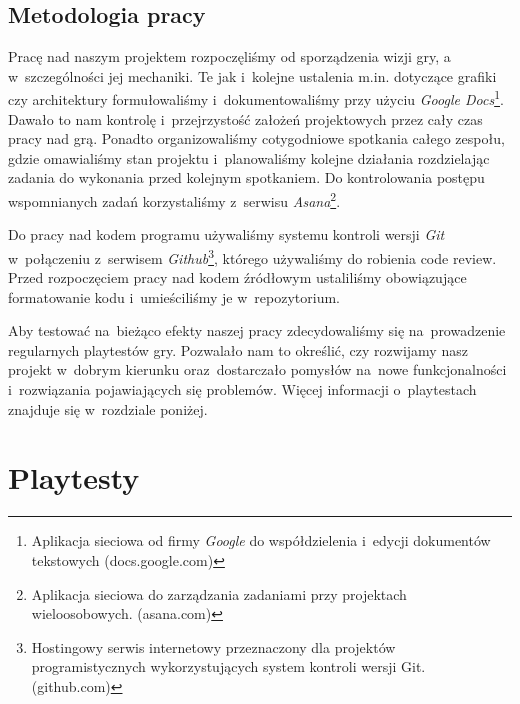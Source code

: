 \documentclass[licencjacka]{pracamgr}
\begin{document}
  \section{Metodologia pracy}
    Pracę nad naszym projektem rozpoczęliśmy od sporządzenia wizji gry, a w~szczególności jej mechaniki. Te jak i~kolejne
    ustalenia m.in. dotyczące grafiki czy architektury formułowaliśmy i~dokumentowaliśmy przy użyciu \emph{Google Docs}\footnote{Aplikacja 
    sieciowa od firmy \emph{Google} do współdzielenia i~edycji dokumentów tekstowych (docs.google.com)}. Dawało to nam kontrolę i~przejrzystość
    założeń projektowych przez cały czas pracy nad grą. Ponadto organizowaliśmy cotygodniowe spotkania całego zespołu, gdzie omawialiśmy stan projektu
    i~planowaliśmy kolejne działania rozdzielając zadania do wykonania przed kolejnym spotkaniem. Do kontrolowania postępu wspomnianych zadań korzystaliśmy
    z~serwisu \emph{Asana}\footnote{Aplikacja sieciowa do zarządzania zadaniami przy projektach wieloosobowych. (asana.com)}.

    Do pracy nad kodem programu używaliśmy systemu kontroli wersji \emph{Git} w~połączeniu z~serwisem \emph{Github}\footnote{Hostingowy
    serwis internetowy przeznaczony dla projektów programistycznych wykorzystujących system kontroli wersji Git. (github.com)}, którego używaliśmy
    do robienia code review. Przed rozpoczęciem pracy nad kodem źródłowym ustaliliśmy obowiązujące formatowanie kodu i~umieściliśmy je w~repozytorium.

    Aby testować na~bieżąco efekty naszej pracy zdecydowaliśmy się na~prowadzenie regularnych playtestów gry. Pozwalało nam to określić,
    czy rozwijamy nasz projekt w~dobrym kierunku oraz~dostarczało pomysłów na~nowe funkcjonalności i~rozwiązania pojawiających się problemów.
    Więcej informacji o~playtestach znajduje się w~rozdziale poniżej.

\chapter{Playtesty}
\end{document}
